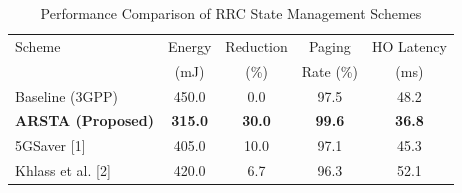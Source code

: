 \begin{table}[t]
\centering
\caption{Performance Comparison of RRC State Management Schemes}
\label{tab:comparison}
\begin{tabular}{@{}lcccc@{}}
\toprule
Scheme & Energy & Reduction & Paging & HO Latency \\
       & (mJ)   & (\%)      & Rate (\%) & (ms) \\
\midrule
Baseline (3GPP) & 450.0 & 0.0 & 97.5 & 48.2 \\
\textbf{ARSTA (Proposed)} & \textbf{315.0} & \textbf{30.0} & \textbf{99.6} & \textbf{36.8} \\
5GSaver [1] & 405.0 & 10.0 & 97.1 & 45.3 \\
Khlass et al. [2] & 420.0 & 6.7 & 96.3 & 52.1 \\
\bottomrule
\end{tabular}
\end{table}